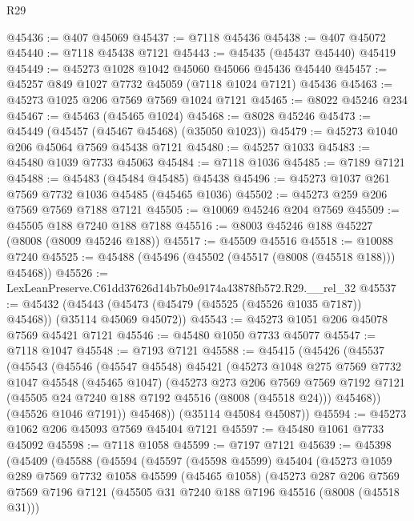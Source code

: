 \begin{lexlean}{R29}
\begin{coremodule}
@45436 := @407 @45069
@45437 := @7118 @45436
@45438 := @407 @45072
@45440 := @7118 @45438 @7121
@45443 := @45435 (@45437 @45440) @45419
@45449 := @45273 @1028 @1042 @45060 @45066 @45436 @45440
@45457 := @45257 @849 @1027 @7732 @45059 (@7118 @1024 @7121) @45436
@45463 := @45273 @1025 @206 @7569 @7569 @1024 @7121
@45465 := @8022 @45246 @234
@45467 := @45463 (@45465 @1024)
@45468 := @8028 @45246
@45473 := @45449 (@45457 (@45467 @45468) (@35050 @1023))
@45479 := @45273 @1040 @206 @45064 @7569 @45438 @7121
@45480 := @45257 @1033
@45483 := @45480 @1039 @7733 @45063
@45484 := @7118 @1036
@45485 := @7189 @7121
@45488 := @45483 (@45484 @45485) @45438
@45496 := @45273 @1037 @261 @7569 @7732 @1036 @45485 (@45465 @1036)
@45502 := @45273 @259 @206 @7569 @7569 @7188 @7121
@45505 := @10069 @45246 @204 @7569
@45509 := @45505 @188 @7240 @188 @7188
@45516 := @8003 @45246 @188 @45227 (@8008 (@8009 @45246 @188))
@45517 := @45509 @45516
@45518 := @10088 @7240
@45525 := @45488 (@45496 (@45502 (@45517 (@8008 (@45518 @188))) @45468))
@45526 := LexLeanPreserve.C61dd37626d14b7b0e9174a43878fb572.R29.__rel_32
@45537 := @45432
    (@45443 (@45473 (@45479 (@45525 (@45526 @1035 @7187)) @45468)) (@35114 @45069 @45072))
@45543 := @45273 @1051 @206 @45078 @7569 @45421 @7121
@45546 := @45480 @1050 @7733 @45077
@45547 := @7118 @1047
@45548 := @7193 @7121
@45588 := @45415
    (@45426
      (@45537
        (@45543
          (@45546
            (@45547 @45548)
            @45421
            (@45273
              @1048
              @275
              @7569
              @7732
              @1047
              @45548
              (@45465 @1047)
              (@45273
                @273
                @206
                @7569
                @7569
                @7192
                @7121
                (@45505 @24 @7240 @188 @7192 @45516 (@8008 (@45518 @24)))
                @45468))
            (@45526 @1046 @7191))
          @45468))
      (@35114 @45084 @45087))
@45594 := @45273 @1062 @206 @45093 @7569 @45404 @7121
@45597 := @45480 @1061 @7733 @45092
@45598 := @7118 @1058
@45599 := @7197 @7121
@45639 := @45398
    (@45409
      (@45588
        (@45594
          (@45597
            (@45598 @45599)
            @45404
            (@45273
              @1059
              @289
              @7569
              @7732
              @1058
              @45599
              (@45465 @1058)
              (@45273
                @287
                @206
                @7569
                @7569
                @7196
                @7121
                (@45505 @31 @7240 @188 @7196 @45516 (@8008 (@45518 @31)))

\end{coremodule}
\end{lexlean}
